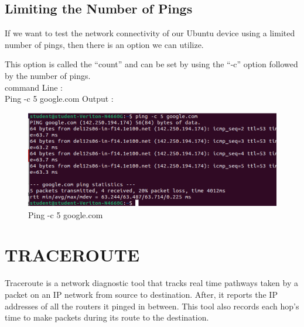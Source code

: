 \documentclass[11pt]{article}
\begin{document}
\subsection{Limiting the Number of Pings}
If we want to test the network connectivity of our Ubuntu device using a limited number of pings, then there is an option we can utilize.

This option is called the “count” and can be set by using the “-c” option followed by the number of pings.\\[12pt]
command Line :\\[6pt]
  Ping -c 5 google.com    
        Output : 
  \begin{figure}[!h]
\centering
\includegraphics[width=\textwidth]{ping_count.png}
\caption{Ping -c 5 google.com}
\end{figure}

\section{TRACEROUTE}
Traceroute is a network diagnostic tool that tracks real time pathways taken by a packet on an IP network from source to destination. After, it reports the IP addresses of all the routers it pinged in between. This tool also records each hop’s time to make packets during its route to the destination.
\end{document}
